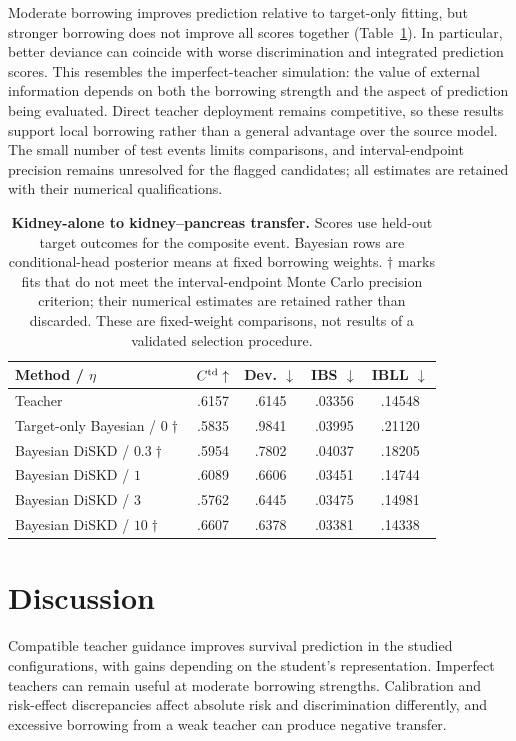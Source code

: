 \documentclass{article} %
\begin{document}
Moderate borrowing improves prediction relative to target-only fitting, but stronger borrowing does not improve all scores together (Table~\ref{tab:real-kidney}). In particular, better deviance can coincide with worse discrimination and integrated prediction scores. This resembles the imperfect-teacher simulation: the value of external information depends on both the borrowing strength and the aspect of prediction being evaluated. Direct teacher deployment remains competitive, so these results support local borrowing rather than a general advantage over the source model. The small number of test events limits comparisons, and interval-endpoint precision remains unresolved for the flagged candidates; all estimates are retained with their numerical qualifications.

\begin{table}[!htbp]
\centering\footnotesize
\caption{\textbf{Kidney-alone to kidney--pancreas transfer.} Scores use held-out target outcomes for the composite event. Bayesian rows are conditional-head posterior means at fixed borrowing weights. $\dagger$ marks fits that do not meet the interval-endpoint Monte Carlo precision criterion; their numerical estimates are retained rather than discarded. These are fixed-weight comparisons, not results of a validated selection procedure.}
\label{tab:real-kidney}
\setlength{\tabcolsep}{6pt}
\begin{tabular}{@{}lcccc@{}}
\toprule
Method / $\eta$ & $C^{\rm td}\uparrow$ & Dev. $\downarrow$ & IBS $\downarrow$ & IBLL $\downarrow$\\
\midrule
Teacher & .6157 & .6145 & .03356 & .14548\\
Target-only Bayesian / $0\dagger$ & .5835 & .9841 & .03995 & .21120\\
Bayesian DiSKD / $0.3\dagger$ & .5954 & .7802 & .04037 & .18205\\
Bayesian DiSKD / $1$ & .6089 & .6606 & .03451 & .14744\\
Bayesian DiSKD / $3$ & .5762 & .6445 & .03475 & .14981\\
Bayesian DiSKD / $10\dagger$ & .6607 & .6378 & .03381 & .14338\\
\bottomrule
\end{tabular}
\end{table}


\section{Discussion}
Compatible teacher guidance improves survival prediction in the studied configurations, with gains depending on the student's representation. Imperfect teachers can remain useful at moderate borrowing strengths. Calibration and risk-effect discrepancies affect absolute risk and discrimination differently, and excessive borrowing from a weak teacher can produce negative transfer.
\end{document}

